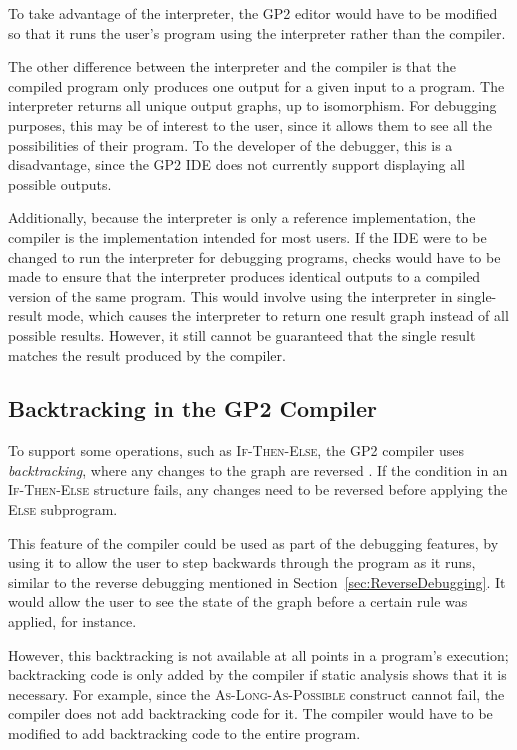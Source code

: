\documentclass[authoryearcitations]{UoYCSproject}
\begin{document}
To take advantage of the interpreter, the GP2 editor would have to be modified
so that it runs the user's program using the interpreter rather than the compiler.

The other difference between the interpreter and the compiler is that the compiled
program only produces one output for a given input to a program. The interpreter
returns all unique output graphs, up to isomorphism. For debugging purposes, this
may be of interest to the user, since it allows them to see all the possibilities
of their program. To the developer of the debugger, this is a disadvantage, since
the GP2 IDE does not currently support displaying all possible outputs.

Additionally, because the interpreter is only a reference implementation, the
compiler is the implementation intended for most users. If the IDE were to be
changed to run the interpreter for debugging programs, checks would have to be
made to ensure that the interpreter produces identical outputs to a compiled
version of the same program. This would involve using the interpreter in
single-result mode, which causes the interpreter to return one result graph
instead of all possible results. However, it still cannot be guaranteed that
the single result matches the result produced by the compiler.


\subsection{Backtracking in the GP2 Compiler}
\label{sec:BacktrackingInTheGP2Compiler}

To support some operations, such as \textsc{If-Then-Else}, the GP2 compiler uses
\emph{backtracking}, where any changes to the graph are reversed \citep[ch. 5.8]{bak2015}.
If the condition in an \textsc{If-Then-Else} structure fails, any changes need
to be reversed before applying the \textsc{Else} subprogram.

This feature of the compiler could be used as part of the debugging features,
by using it to allow the user to step backwards through the program as it runs,
similar to the reverse debugging mentioned in Section~\ref{sec:ReverseDebugging}.
It would allow the user to see the state of the graph before a certain rule was
applied, for instance.

However, this backtracking is not available at all points in a program's
execution; backtracking code is only added by the compiler if static analysis
shows that it is necessary. For example, since the \textsc{As-Long-As-Possible}
construct cannot fail, the compiler does not add backtracking code for it. The
compiler would have to be modified to add backtracking code to the entire
program.
\end{document}
